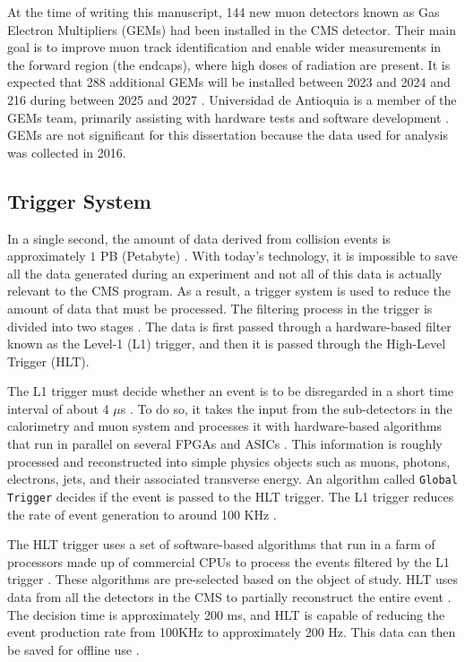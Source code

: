 At the time of writing this manuscript, 144 new muon detectors known as Gas Electron Multipliers (GEMs) had been installed in the CMS detector. Their main goal is to improve muon track identification and enable wider measurements in the forward region (the endcaps), where high doses of radiation are present. It is expected that 288 additional GEMs will be installed between 2023 and 2024 and 216 during between 2025 and 2027 \cite{cern2020ls2, cerngems}. Universidad de Antioquia is a member of the GEMs team, primarily assisting with hardware tests and software development \cite{cms25udea}. GEMs are not significant for this dissertation because the data used for analysis was collected in 2016.

\subsection{Trigger System}
\label{subsection:trig_sys}
In a single second, the amount of data derived from collision events is approximately $1$ PB (Petabyte) \cite{baron2018desarrollo}. With today's technology, it is impossible to save all the data generated during an experiment and not all of this data is actually relevant to the CMS program. As a result, a trigger system is used to reduce the amount of data that must be processed. The filtering process in the trigger is divided into two stages \cite{muhammad2021measurement}. The data is first passed through a hardware-based filter known as the Level-1 (L1) trigger, and then it is passed through the High-Level Trigger (HLT).

The L1 trigger must decide whether an event is to be disregarded in a short time interval of about 4 $\mu$s \cite{bragagnolo2021measurement}. To do so, it takes the input from the sub-detectors in the calorimetry and muon system and processes it with hardware-based algorithms that run in parallel on several FPGAs and ASICs \cite{muhammad2021measurement}. This information is roughly processed and reconstructed into simple physics objects such as muons, photons, electrons, jets, and their associated transverse energy. An algorithm called \verb|Global Trigger| decides if the event is passed to the HLT trigger. The L1 trigger reduces the rate of event generation to around 100 KHz \cite{bragagnolo2021measurement, muhammad2021measurement}.

The HLT trigger uses a set of software-based algorithms that run in a farm of processors made up of commercial CPUs to process the events filtered by the L1 trigger \cite{bragagnolo2021measurement}. These algorithms are pre-selected based on the object of study. HLT uses data from all the detectors in the CMS to partially reconstruct the entire event \cite{bragagnolo2021measurement}. The decision time is approximately 200 ms, and HLT is capable of reducing the event production rate from 100KHz to approximately 200 Hz. This data can then be saved for offline use \cite{fedi2016studies, danilov2020measurement}.